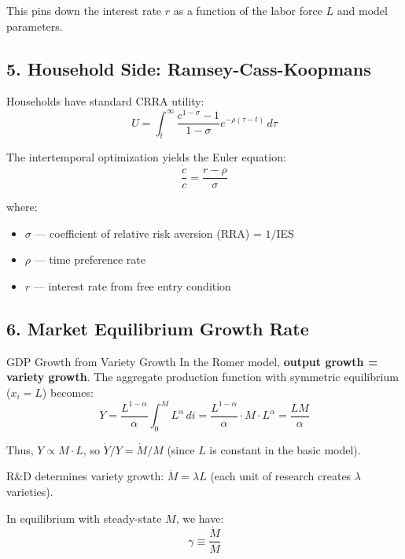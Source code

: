 \documentclass[a4paper,11pt]{article}
\begin{document}
This pins down the interest rate $r$ as a function of the labor force $L$ and model parameters.

\subsection*{5. Household Side: Ramsey-Cass-Koopmans}

\bigskip
\noindent Households have standard CRRA utility:
\[
U = \int_t^\infty \frac{c^{1-\sigma} - 1}{1-\sigma} e^{-\rho(\tau-t)} \, d\tau
\]

\medskip
\begin{tcolorbox}[colback=blue!5,colframe=blue3,title=Consumption Euler Equation]
The intertemporal optimization yields the Euler equation:
\[
\boxed{\frac{\dot{c}}{c} = \frac{r - \rho}{\sigma}}
\tag{Euler Equation}
\]

where:
\begin{itemize}
    \item $\sigma$ --- coefficient of relative risk aversion (RRA) = $1/$IES
    \item $\rho$ --- time preference rate
    \item $r$ --- interest rate from free entry condition
\end{itemize}
\end{tcolorbox}

\subsection*{6. Market Equilibrium Growth Rate}

\bigskip
\begin{derivationbox}{GDP Growth from Variety Growth}
In the Romer model, \textbf{output growth = variety growth}. The aggregate production function with symmetric equilibrium ($x_i = L$) becomes:
\[
Y = \frac{L^{1-\alpha}}{\alpha} \int_0^M L^\alpha \, di = \frac{L^{1-\alpha}}{\alpha} \cdot M \cdot L^\alpha = \frac{L M}{\alpha}
\]

Thus, $Y \propto M \cdot L$, so $\dot{Y}/Y = \dot{M}/M$ (since $L$ is constant in the basic model).

R\&D determines variety growth: $\dot{M} = \lambda L$ (each unit of research creates $\lambda$ varieties).

In equilibrium with steady-state $M$, we have:
\[
\gamma \equiv \frac{\dot{M}}{M}
\]
\end{derivationbox}
\end{document}
